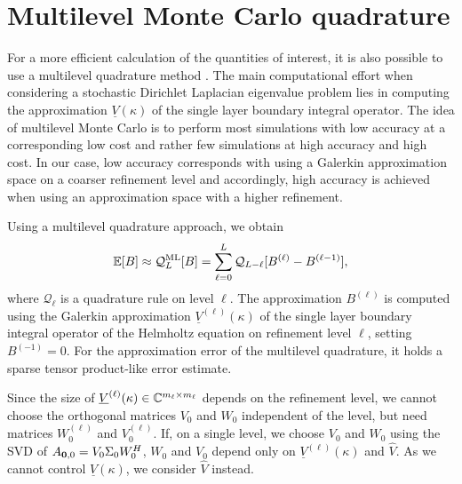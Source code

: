 \section{Multilevel Monte Carlo quadrature}
For a more efficient calculation of the quantities of interest, it is also possible to use a multilevel quadrature method \cite{DOLZ2022114242,Giles_2015}.
The main computational effort when considering a stochastic Dirichlet Laplacian eigenvalue problem lies in computing the approximation $\underline{V}(\kappa)$ of the single layer boundary integral operator.
The idea of multilevel Monte Carlo is to perform most simulations with low accuracy at a corresponding low cost and rather few simulations at high accuracy and high cost.
In our case, low accuracy corresponds with using a Galerkin approximation space on a coarser refinement level and accordingly, high accuracy is achieved when using an approximation space with a higher refinement.

Using a multilevel quadrature approach, we obtain
\begin{equation}
    \label{eq:B-multilevel}
    \bE[B] \approx \mathcal{Q}_L^{\text{ML}} [B] = \sum_{\ell=0}^L \mathcal{Q}_{L-\ell} [B^{(\ell)}-B^{(\ell-1)}],
\end{equation}
where $\mathcal{Q}_{\ell}$ is a quadrature rule on level $\ell$.
The approximation $B^{(\ell)}$ is computed using the Galerkin approximation $\underline{V}^{(\ell)}(\kappa)$ of the single layer boundary integral operator of the Helmholtz equation on refinement level $\ell$, setting $B^{(-1)} = 0$. For the approximation error of the multilevel quadrature, it holds a sparse tensor product-like error estimate.
\iffalse
If $\varepsilon_{\ell} \to 0$ is a monotonically decreasing sequence with $\varepsilon_{\ell} \cdot \varepsilon_{L-\ell} = \varepsilon_L$ for every $L\in \bN$ and
\[
    \lVert \mathcal{B}_{L-\ell}-\bE[B]\rVert \leq c_1\varepsilon_{L-\ell} \quad \text{and}\quad \lVert B^{(\ell)}-B\rVert \leq c_2\varepsilon_{\ell}
\]
for some suitable norms and constants $c_1,c_2 > 0$, then
\[
    \lVert \mathcal{Q}_L^{\text{ML}}[B] - \bE[B] \rVert \leq C\varepsilon_L
\]
for a constant $C>0$, \comment{what conditions do we need?}. %
\fi

Since the size of $\underline{V}^{(\ell)}(\kappa) \in \mathbb{C}^{m_{\ell} \times m_{\ell}}$ depends on the refinement level, we cannot choose the orthogonal matrices $V_0$ and $W_0$ independent of the level, but need matrices $W_0^{(\ell)}$ and $V_0^{(\ell)}$.
If, on a single level, we choose $V_0$ and $W_0$ using the SVD of $A_{\mathbf{0},0} = V_0 \Sigma_0 W_0^H$, $W_0$ and $V_0$ depend only on $\underline{V}^{(\ell)}(\kappa)$ and $\widehat{V}$.
As we cannot control $\underline{V}(\kappa)$, we consider $\widehat{V}$ instead.

